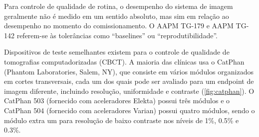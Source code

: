 \documentclass[11pt,a4paper]{article}
\begin{document}
    Para controle de qualidade de rotina, o desempenho do sistema de imagem geralmente não é medido em um sentido absoluto, mas sim em relação ao desempenho no momento do comissionamento. O AAPM TG-179 e AAPM TG-142 referem-se às tolerâncias como ``baselines'' ou ``reprodutibilidade''.

    Dispositivos de teste semelhantes existem para o controle de qualidade de tomografias computadorizadas (CBCT). A maioria das clínicas usa o CatPhan (Phantom Laboratories, Salem, NY), que consiste em vários módulos organizados em cortes transversais, cada um dos quais pode ser avaliado para um endpoint de imagem diferente, incluindo resolução, uniformidade e contraste (\ref{fig:catphan}). O CatPhan 503 (fornecido com aceleradores Elekta) possui três módulos e o CatPhan 504 (fornecido com aceleradores Varian) possui quatro módulos, sendo o módulo extra um para resolução de baixo contraste nos níveis de 1\%, 0.5\% e 0.3\%.
\end{document}
